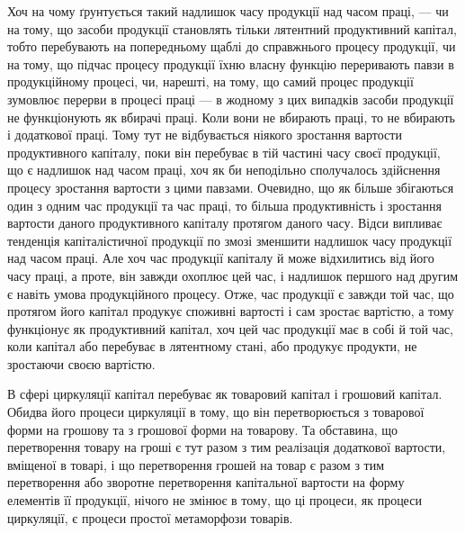 Хоч на чому ґрунтується такий надлишок часу продукції над часом
праці, — чи на тому, що засоби продукції становлять тільки лятентний
продуктивний капітал, тобто перебувають на попередньому щаблі до
справжнього процесу продукції, чи на тому, що підчас процесу продукції
їхню власну функцію переривають павзи в продукційному процесі, чи,
нарешті, на тому, що самий процес продукції зумовлює перерви в процесі
праці — в жодному з цих випадків засоби продукції не функціонують як
вбирачі праці. Коли вони не вбирають праці, то не вбирають і додаткової
праці. Тому тут не відбувається ніякого зростання вартости продуктивного
капіталу, поки він перебуває в тій частині часу своєї продукції, що є надлишок
над часом праці, хоч як би неподільно сполучалось здійснення процесу
зростання вартости з цими павзами. Очевидно, що як більше збігаються один
з одним час продукції та час праці, то більша продуктивність і зростання
вартости даного продуктивного капіталу протягом даного часу. Відси
випливає тенденція капіталістичної продукції по змозі зменшити надлишок
часу продукції над часом праці. Але хоч час продукції капіталу й може
відхилитись від його часу праці, а проте, він завжди охоплює цей час,
і надлишок першого над другим є навіть умова продукційного процесу.
Отже, час продукції є завжди той час, що протягом його капітал продукує
споживні вартості і сам зростає вартістю, а тому функціонує як
продуктивний капітал, хоч цей час продукції має в собі й той час, коли
капітал або перебуває в лятентному стані, або продукує продукти, не
зростаючи своєю вартістю.

В сфері циркуляції капітал перебуває як товаровий капітал і грошовий
капітал. Обидва його процеси циркуляції в тому, що він перетворюється
з товарової форми на грошову та з грошової форми на товарову. Та
обставина, що перетворення товару на гроші є тут разом з тим реалізація
додаткової вартости, вміщеної в товарі, і що перетворення грошей
на товар є разом з тим перетворення або зворотне перетворення капітальної
вартости на форму елементів її продукції, нічого не змінює в
тому, що ці процеси, як процеси циркуляції, є процеси простої метаморфози
товарів.

